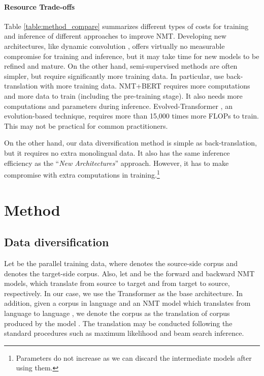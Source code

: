 \documentclass{article}
\begin{document}
 
\vspace{-0.5em}
\paragraph{Resource Trade-offs}
Table \ref{table:method_compare} summarizes different types of costs for training and inference of different approaches to improve NMT. Developing new architectures, like dynamic convolution \citep{payless_wu2018}, offers virtually no measurable compromise for training and inference, but it may take time for new models to be refined and mature.
On the other hand, semi-supervised methods are often simpler, but require significantly more training data. In particular, \citet{understanding_backtranslation_scale} use back-translation with  more training data. NMT+BERT \citep{bert_nmt} requires  {more} computations and  more data to train (including the pre-training stage). It also needs  more computations and parameters during inference. 
Evolved-Transformer \citep{so2019evolved}, an evolution-based technique, requires more than 15,000 times more FLOPs to train. This may not be practical for common practitioners. 
 
On the other hand, our data diversification method is simple as back-translation, but it requires no extra monolingual data. It also has the same inference efficiency as the ``\textit{New Architectures}'' approach. However, it has to make compromise with extra computations in training.\footnote{Parameters  do not increase as we can discard the intermediate models after using them.}  


 
\section{Method}


\subsection{Data diversification} \label{subsec:datadiver}

Let  be the parallel training data, where  denotes the source-side corpus and  denotes the target-side corpus. Also, {let  and } be the forward and backward NMT models, which translate from source to target and from target to source, respectively. In our case, we use the Transformer \citep{vaswani2017attention} as the base architecture. In addition, given a corpus  in language  and an NMT model  which translates from language  to language , we denote the corpus  as the translation of corpus  produced by the model . The translation may be conducted following the standard procedures such as maximum likelihood and beam search inference.
\end{document}
